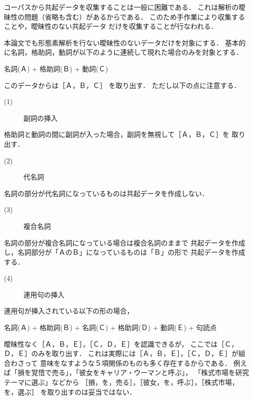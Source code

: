 コーパスから共起データを収集することは一般に困難である．
これは解析の曖昧性の問題（省略も含む）があるからである．
このため手作業により収集することや\cite{tanaka}，曖昧性のない共起データ
だけを収集することが行なわれる\cite{nakajima}．


本論文でも形態素解析を行ない曖昧性のないデータだけを対象にする．
基本的に名詞，格助詞，動詞が以下のように連続して現れた場合のみを対象とする．
\begin{center}
名詞(Ａ) + 格助詞(Ｂ) + 動詞(Ｃ)  
\end{center}
このデータからは［Ａ，Ｂ，Ｃ］ を取り出す．
ただし以下の点に注意する．

\begin{description}
\item[(1)] 副詞の挿入
\end{description}

格助詞と動詞の間に副詞が入った場合，副詞を無視して［Ａ，Ｂ，Ｃ］を
取り出す．

\begin{description}
\item[(2)] 代名詞
\end{description}

名詞の部分が代名詞になっているものは共起データを作成しない．

\begin{description}
\item[(3)] 複合名詞
\end{description}

名詞の部分が複合名詞になっている場合は複合名詞のままで
共起データを作成し，名詞部分が「ＡのＢ」になっているものは「Ｂ」の形で
共起データを作成する．

\begin{description}
\item[(4)] 連用句の挿入
\end{description}

連用句が挿入されている以下の形の場合，
\begin{center}
名詞(Ａ) + 格助詞(Ｂ) +  名詞(Ｃ) + 格助詞(Ｄ) + 動詞(Ｅ) + 句読点  
\end{center}
曖昧性なく［Ａ，Ｂ，Ｅ］，［Ｃ，Ｄ，Ｅ］を認識できるが，
ここでは［Ｃ，Ｄ，Ｅ］のみを取り出す．
これは実際には［Ａ，Ｂ，Ｅ］，［Ｃ，Ｄ，Ｅ］が組合わさって
意味をなすような５項関係のものも多く存在するからである．
例えば「損を覚悟で売る」，「彼女をキャリア・ウーマンと呼ぶ」，
「株式市場を研究テーマに選ぶ」などから
［損，を，売る］，［彼女，を，呼ぶ］，［株式市場，を，選ぶ］
を取り出すのは妥当ではない．

